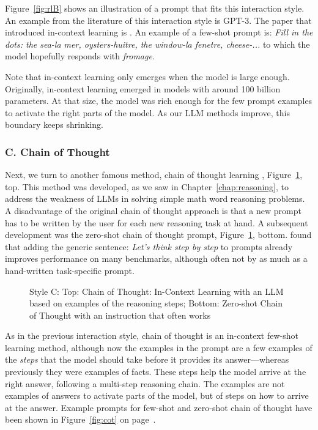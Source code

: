 Figure~\ref{fig:rlB} shows an illustration of a prompt that fits this
interaction style. An example from the literature of this interaction style is GPT-3. The
paper that introduced in-context learning  is
\citet{brown2020language}. An example of a few-shot prompt is: {\em Fill
in the dots: the
sea-la mer, oysters-huitre, the window-la fenetre, cheese-...} to
which the model hopefully responds with {\em fromage}.

Note that in-context learning only emerges when the model is large
enough. Originally, in-context learning emerged in
models with around 100 billion parameters. At that size, the model
was rich enough for the few prompt examples to activate the right
parts of the model. As our LLM methods improve, this boundary keeps shrinking.

\subsubsection{C. Chain of Thought}
Next, we turn to another famous method, chain of thought learning \citep{wei2022chain}, Figure~\ref{fig:rlC}, top.  This method
was developed, as we saw in Chapter~\ref{chap:reasoning}, to address
the weakness of LLMs in solving simple math word reasoning problems. A disadvantage of the original chain of thought approach is that
a new  prompt has to be written by the user for each new reasoning task at
hand. A subsequent development was the zero-shot chain of thought prompt, Figure~\ref{fig:rlC}, bottom. \citet{kojima2022large} found that adding the generic sentence: {\em Let's
think step by step} to  prompts already improves performance on many benchmarks, 
although often not by as much as a hand-written task-specific prompt.
\begin{figure}
  \begin{center}
    
    \caption{Style C: Top: Chain of Thought: In-Context  Learning with an LLM based on examples of the reasoning steps; Bottom: Zero-shot Chain of Thought with an instruction that often works}\label{fig:rlC}
  \end{center}
\end{figure}
As in the previous interaction style, chain of thought is an in-context few-shot learning method, although now
the examples in the prompt are a few examples of the {\em steps} that the model
should take before it provides its answer---whereas previously they were examples of facts. These steps help the model 
arrive at the right answer, following a multi-step reasoning
chain. The examples are not examples of  answers to activate parts of the model, but of steps on
how to arrive at the answer. Example prompts for few-shot and zero-shot chain of thought
have been shown in Figure~\ref{fig:cot} on page~\pageref{fig:cot}. %

